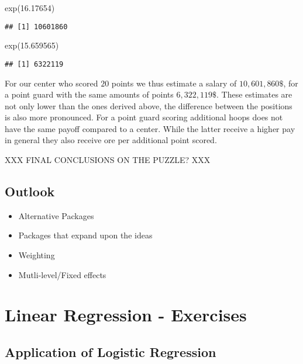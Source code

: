 \documentclass[
]{book}
\newenvironment{Shaded}{\begin{snugshade}}{\end{snugshade}}
\newcommand{\FloatTok}[1]{\textcolor[rgb]{0.00,0.00,0.81}{#1}}
\newcommand{\FunctionTok}[1]{\textcolor[rgb]{0.00,0.00,0.00}{#1}}
\newcommand{\NormalTok}[1]{#1}
\providecommand{\tightlist}{%
  \setlength{\itemsep}{0pt}\setlength{\parskip}{0pt}}
\begin{document}
\begin{Shaded}
\begin{Highlighting}[]
\FunctionTok{exp}\NormalTok{(}\FloatTok{16.17654}\NormalTok{)}
\end{Highlighting}
\end{Shaded}

\begin{verbatim}
## [1] 10601860
\end{verbatim}

\begin{Shaded}
\begin{Highlighting}[]
\FunctionTok{exp}\NormalTok{(}\FloatTok{15.659565}\NormalTok{)}
\end{Highlighting}
\end{Shaded}

\begin{verbatim}
## [1] 6322119
\end{verbatim}

For our center who scored \(20\) points we thus estimate a salary of
\(10,601,860\$\), for a point guard with the same amounts of points \(6,322,119\$\).
These estimates are not only lower than the ones derived above, the difference
between the positions is also more pronounced. For a point guard scoring
additional hoops does not have the same payoff compared to a center. While the
latter receive a higher pay in general they also receive ore per additional
point scored.

XXX FINAL CONCLUSIONS ON THE PUZZLE? XXX

\hypertarget{outlook}{%
\section{Outlook}\label{outlook}}

\begin{itemize}
\tightlist
\item
  Alternative Packages
\item
  Packages that expand upon the ideas
\item
  Weighting
\item
  Mutli-level/Fixed effects
\end{itemize}

\hypertarget{lin-e}{%
\chapter{Linear Regression - Exercises}\label{lin-e}}

\hypertarget{application-of-logistic-regression}{%
\section{Application of Logistic Regression}\label{application-of-logistic-regression}}
\end{document}

